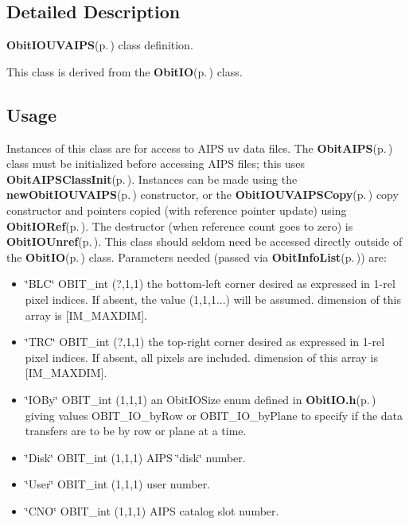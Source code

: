 \subsection{Detailed Description}
{\bf Obit\-IOUVAIPS}{\rm (p.\,\pageref{structObitIOUVAIPS})} class definition. 

This class is derived from the {\bf Obit\-IO}{\rm (p.\,\pageref{structObitIO})} class.\subsection{Usage}\label{ObitIOUVAIPS_8h_ObitIOUVAIPSUsage}
Instances of this class are for access to AIPS uv data files. The {\bf Obit\-AIPS}{\rm (p.\,\pageref{structObitAIPS})} class must be initialized before accessing AIPS files; this uses {\bf Obit\-AIPSClass\-Init}{\rm (p.\,\pageref{ObitAIPS_8c_a5})}. Instances can be made using the {\bf new\-Obit\-IOUVAIPS}{\rm (p.\,\pageref{ObitIOUVAIPS_8c_a10})} constructor, or the {\bf Obit\-IOUVAIPSCopy}{\rm (p.\,\pageref{ObitIOUVAIPS_8c_a15})} copy constructor and pointers copied (with reference pointer update) using {\bf Obit\-IORef}{\rm (p.\,\pageref{ObitIO_8h_a1})}. The destructor (when reference count goes to zero) is {\bf Obit\-IOUnref}{\rm (p.\,\pageref{ObitIO_8h_a0})}. This class should seldom need be accessed directly outside of the {\bf Obit\-IO}{\rm (p.\,\pageref{structObitIO})} class. Parameters needed (passed via {\bf Obit\-Info\-List}{\rm (p.\,\pageref{structObitInfoList})}) are: \begin{itemize}
\item \char`\"{}BLC\char`\"{} OBIT\_\-int (?,1,1) the bottom-left corner desired as expressed in 1-rel pixel indices. If absent, the value (1,1,1...) will be assumed. dimension of this array is [IM\_\-MAXDIM]. \item \char`\"{}TRC\char`\"{} OBIT\_\-int (?,1,1) the top-right corner desired as expressed in 1-rel pixel indices. If absent, all pixels are included. dimension of this array is [IM\_\-MAXDIM]. \item \char`\"{}IOBy\char`\"{} OBIT\_\-int (1,1,1) an Obit\-IOSize enum defined in {\bf Obit\-IO.h}{\rm (p.\,\pageref{ObitIO_8h})} giving values OBIT\_\-IO\_\-by\-Row or OBIT\_\-IO\_\-by\-Plane to specify if the data transfers are to be by row or plane at a time. \item \char`\"{}Disk\char`\"{} OBIT\_\-int (1,1,1) AIPS \char`\"{}disk\char`\"{} number. \item \char`\"{}User\char`\"{} OBIT\_\-int (1,1,1) user number. \item \char`\"{}CNO\char`\"{} OBIT\_\-int (1,1,1) AIPS catalog slot number.\end{itemize}


